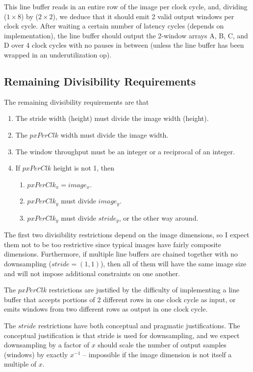\documentclass[12pt]{article}
\begin{document}
This line buffer reads in an entire row of the image per clock cycle,
and, dividing ($1\times 8$) by ($2\times 2$), we deduce that it should
emit 2 valid output windows per clock cycle. After waiting a certain
number of latency cycles (depends on implementation), the line buffer
should output the 2-window arrays A, B, C, and D over 4 clock cycles
with no pauses in between (unless the line buffer has been wrapped in
an underutilization op).

\subsection{Remaining Divisibility Requirements}

The remaining divisibility requirements are that
\begin{enumerate}
  \item The stride width (height) must divide the image width (height).
  \item The $pxPerClk$ width must divide the image width.
  \item The window throughput must be an integer or a reciprocal of an integer.
  \item If $pxPerClk$ height is not 1, then
  \begin{enumerate}
    \item $pxPerClk_x = image_x$.
    \item $pxPerClk_y$ must divide $image_y$.
    \item $pxPerClk_y$ must divide $stride_y$, or the other way around.
  \end{enumerate}
\end{enumerate}

The first two divisibility restrictions depend on the image
dimensions, so I expect them not to be too restrictive since typical
images have fairly composite dimensions. Furthermore, if multiple line
buffers are chained together with no downsampling ($stride = (1,1)$),
then all of them will have the same image size and will not impose
additional constraints on one another.

The $pxPerClk$ restrictions are justified by the difficulty of
implementing a line buffer that accepts portions of 2 different rows
in one clock cycle as input, or emits windows from two different rows
as output in one clock cycle.

The $stride$ restrictions have both conceptual and pragmatic
justifications. The conceptual justification is that stride is used
for downsampling, and we expect downsampling by a factor of $x$ should
scale the number of output samples (windows) by exactly $x^{-1}$ --
impossible if the image dimension is not itself a multiple of $x$.
\end{document}
